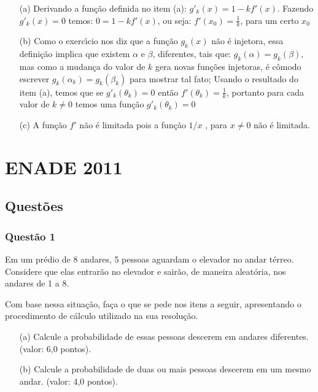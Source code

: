 \documentclass{report}
\begin{document}
\begin{enumerate}

\item[(a)] Derivando a fun\c c\~ao definida no item (a): $g'_k(x)=1-kf'(x)$. Fazendo $g'_k(x)=0$ temos: $0=1-kf'(x)$, ou seja: $f'(x_0)=\frac1{k}$, para um certo $x_0$

\item[(b)] Como o exerc\'\i cio nos diz que a fun\c c\~ao $g_k(x)$ n\~ao \'e injetora, essa defini\c c\~ao implica que existem $\alpha$ e $\beta$, diferentes, tais que: $g_k(\alpha)=g_k(\beta)$, mas como a mudan\c ca do valor de $k$ gera novas fun\c c\~oes injetoras, \'e cômodo escrever $g_k(\alpha_k)=g_k(\beta_k)$ para mostrar tal fato; Usando o resultado do item (a), temos que se $g'_k(\theta_k)=0$ ent\~ao $f'(\theta_k)=\frac1{k}$, portanto para cada valor de $k\neq 0$ temos uma fun\c c\~ao $g'_k(\theta_k)=0$

\item[(c)] A fun\c c\~ao $f'$ n\~ao \'e limitada pois a fun\c c\~ao $1/x$ , para $x \neq 0$ n\~ao \'e limitada.

\end{enumerate}

\chapter{ENADE 2011}

\section{\color{blue} Quest\~oes}

\subsection{\color{blue} Quest\~ao 1}

Em um pr\'edio de 8 andares, 5 pessoas aguardam o elevador no andar t\'erreo. Considere que elas entrar\~ao no elevador e sair\~ao, de maneira aleat\'oria, nos andares de 1 a 8.

Com base nessa situa\c c\~ao, fa\c ca o que se pede nos itens a seguir, apresentando o procedimento de c\'alculo utilizado na sua resolu\c c\~ao.

\begin{enumerate}

\item[(a)] Calcule a probabilidade de essas pessoas descerem em andares diferentes. (valor: 6,0 pontos).

\item[(b)] Calcule a probabilidade de duas ou mais pessoas descerem em um mesmo andar. (valor: 4,0 pontos).

\end{enumerate}
\end{document}
